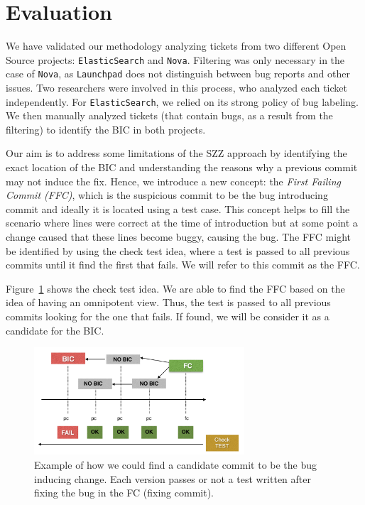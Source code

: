 \documentclass[conference]{IEEEtran}
\begin{document}
\section{Evaluation} 

We have validated our methodology analyzing tickets from two different Open Source projects: \texttt{ElasticSearch} and \texttt{Nova}.
Filtering was only necessary in the case of \texttt{Nova}, as \texttt{Launchpad} does not distinguish between bug reports and other issues.
Two researchers were involved in this process, who analyzed each ticket independently.
For \texttt{ElasticSearch}, we relied on its strong policy of bug labeling.
We then manually analyzed tickets (that contain bugs, as a result from the filtering) to identify the BIC in both projects.

Our aim is to address some limitations of the SZZ approach by identifying the exact location of the BIC and understanding the reasons why a previous commit may not induce the fix. 
Hence, we introduce a new concept: the \emph{First Failing Commit (FFC)}, which is the suspicious commit to be the bug introducing commit and ideally it is located using a test case.
This concept helps to fill the scenario where lines were correct at the time of introduction but at some point a change caused that these lines become buggy, causing the bug.
The FFC might be identified by using the check test idea, where a test is passed to all previous commits until it find the first that fails.
We will refer to this commit as the FFC.


Figure~\ref{fig:test} shows the check test idea.
We are able to find the FFC based on the idea of having an omnipotent view. 
Thus, the test is passed to all previous commits looking for the one that fails.
If found, we will be consider it as a candidate for the BIC.

\begin{figure}[ht]
\centering
\includegraphics[height=4cm]{testrecursive.png}
\caption{Example of how we could find a candidate commit to be the  bug inducing change. Each version passes or not a test written after fixing the bug in the FC (fixing commit).}
\label{fig:test}      
\end{figure}
\end{document}
